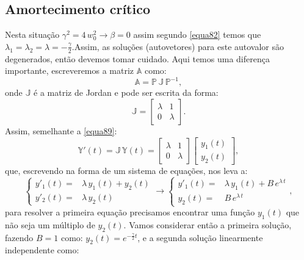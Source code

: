 \documentclass[12pt,openright,twoside,english,brazil]{abntex2}
\begin{document}
\subsection{Amortecimento crítico}
Nesta situação $\gamma^2 = 4\, w_0^2 \rightarrow \beta = 0$ assim segundo \ref{equa82} temos que $\lambda_1=\lambda_2 = \lambda = -\frac{\gamma}{2}$.Assim, as soluções (autovetores) para este autovalor são degenerados, então devemos tomar cuidado. Aqui temos uma diferença importante, escreveremos a matriz $\mathbb{A}$ como:
\begin{equation}
 \mathbb{A} = \mathbb{P}\, \mathbb{J}\, \mathbb{P}^{-1},
 \label{equa97}
\end{equation}
onde $\mathbb{J}$ é a matriz de Jordan e pode ser escrita da forma:
\begin{equation}
 \mathbb{J} = \begin{bmatrix}
               \lambda & 1 \\
               0 & \lambda
              \end{bmatrix}.
 \label{equa98}
\end{equation}
Assim, semelhante a \ref{equa89}:
\begin{equation}
 \mathbb{Y}'(t) = \mathbb{J}\, \mathbb{Y}(t) = \begin{bmatrix}
                     \lambda & 1 \\
                     0 & \lambda
                     \end{bmatrix} \begin{bmatrix}
                                    y_1(t) \\
                                    y_2(t)
                                   \end{bmatrix},
 \label{equa99}
\end{equation}
que, escrevendo na forma de um sistema de equações, nos leva a:
\begin{equation}
 \begin{cases}
 y'_1(t) = & \lambda\, y_1(t) + y_2(t) \\
 y'_2(t) = & \lambda\, y_2(t)
 \end{cases} \rightarrow \begin{cases}
                          y'_1(t) = & \lambda\, y_1(t) + B\, e^{\lambda\, t} \\
                          y_2(t) = & B\, e^{\lambda\, t}
                         \end{cases},
 \label{equa100}
\end{equation}
para resolver a primeira equação precisamos encontrar uma função $y_1(t)$ que não seja um múltiplo de $y_2(t)$. Vamos considerar então a primeira solução, fazendo $B=1$ como: $y_2(t) = e^{-\frac{\gamma}{2} t}$, e a segunda solução linearmente independente como:
\end{document}
